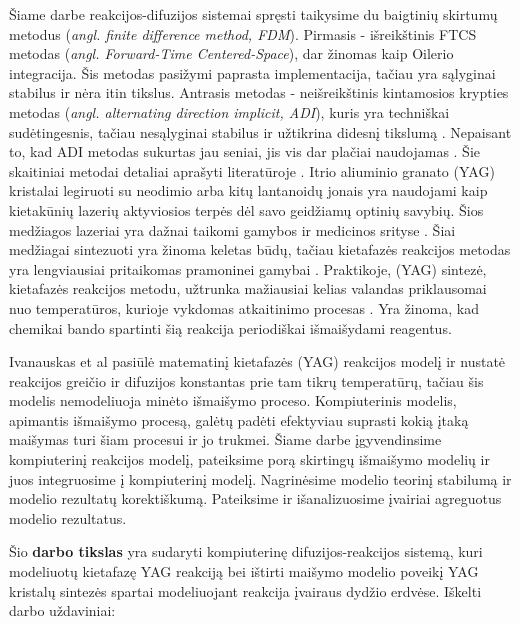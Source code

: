 Šiame darbe reakcijos-difuzijos sistemai spręsti taikysime du baigtinių skirtumų metodus (\textit{angl. finite difference method, FDM}). Pirmasis - išreikštinis FTCS metodas (\textit{angl. Forward-Time Centered-Space}), dar žinomas kaip Oilerio integracija. Šis metodas pasižymi paprasta implementacija, tačiau yra sąlyginai stabilus ir nėra itin tikslus. Antrasis metodas - neišreikštinis kintamosios krypties metodas (\textit{angl. alternating direction implicit, ADI}), kuris yra techniškai sudėtingesnis, tačiau nesąlyginai stabilus ir užtikrina didesnį tikslumą \cite{doi:10.1137/0103003}. Nepaisant to, kad ADI metodas sukurtas jau seniai, jis vis dar plačiai naudojamas \cite{gaidamauskaiteComparisonFiniteDifference2007}. Šie skaitiniai metodai detaliai aprašyti literatūroje \cite{pressNumericalRecipes3rd2007,levequeFiniteDifferenceMethods2007}.
\newpage 
Itrio aliuminio granato (YAG) kristalai legiruoti su neodimio arba kitų lantanoidų jonais yra naudojami kaip kietakūnių lazerių aktyviosios terpės dėl savo geidžiamų optinių savybių. Šios medžiagos lazeriai yra dažnai taikomi gamybos ir medicinos srityse \cite{dubeyExperimentalStudyNd2008, valentiUseErYAG2021}. Šiai medžiagai sintezuoti yra žinoma keletas būdų, tačiau kietafazės reakcijos metodas yra lengviausiai pritaikomas pramoninei gamybai \cite{bhattacharyyaMethodsSynthesisY3AI5O122007, zhangNovelSynthesisYAG2005}. Praktikoje, (YAG) sintezė, kietafazės reakcijos metodu, užtrunka mažiausiai kelias valandas priklausomai nuo temperatūros, kurioje vykdomas atkaitinimo procesas \cite{mackeviciusCloserLookComputer2012}. Yra žinoma, kad chemikai bando spartinti šią reakcija periodiškai išmaišydami reagentus.

Ivanauskas et al \cite{ivanauskasModellingSolidState2005} pasiūlė matematinį kietafazės (YAG) reakcijos modelį ir nustatė reakcijos greičio ir difuzijos konstantas prie tam tikrų temperatūrų, tačiau šis modelis nemodeliuoja minėto išmaišymo proceso. Kompiuterinis modelis, apimantis išmaišymo procesą, galėtų padėti efektyviau suprasti kokią įtaką maišymas turi šiam procesui ir jo trukmei. Šiame darbe įgyvendinsime kompiuterinį reakcijos modelį, pateiksime porą skirtingų išmaišymo modelių ir juos integruosime į kompiuterinį modelį. Nagrinėsime modelio teorinį stabilumą ir modelio rezultatų korektiškumą. Pateiksime ir išanalizuosime įvairiai agreguotus modelio rezultatus.

Šio \textbf{darbo tikslas} yra sudaryti kompiuterinę difuzijos-reakcijos sistemą, kuri modeliuotų kietafazę YAG reakciją bei ištirti maišymo modelio poveikį YAG kristalų sintezės spartai modeliuojant reakcija įvairaus dydžio erdvėse. Iškelti darbo uždaviniai:

